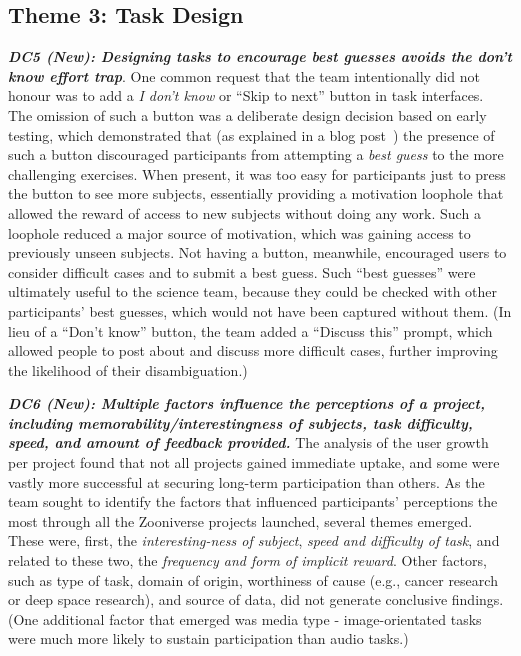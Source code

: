 \documentclass{sigchi}
\begin{document}
\begin{spacing}{0.97}
\subsection{Theme 3: Task Design} 

\textbf{\emph{DC5 (New): Designing tasks to encourage \emph{best guesses} avoids the \emph{don't know} effort trap}}. One common request that the team intentionally did not honour was to add a \emph{I don't know} or ``Skip to next'' button in task interfaces. The omission of such a button was a deliberate design decision based on early testing, which demonstrated that (as explained in a blog post~\cite{zooniverseblog}) the presence of such a button discouraged participants from attempting a \emph{best guess} to the more challenging exercises. When present, it was too easy for participants just to press the button to see more subjects, essentially providing a motivation loophole that allowed the reward of access to new subjects without doing any work. Such a loophole reduced a major source of motivation, which was gaining access to previously unseen subjects. Not having a button, meanwhile, encouraged users to consider difficult cases and to submit a best guess. Such ``best guesses'' were ultimately useful to the science team, because they could be checked with other participants' best guesses, which would not have been captured without them. (In lieu of a ``Don't know'' button, the team added a ``Discuss this'' prompt, which allowed people to post about and discuss more difficult cases, further improving the likelihood of their disambiguation.)

\textbf{\emph{DC6 (New): Multiple factors influence the perceptions of a project, including memorability/interestingness of subjects, task difficulty, speed, and amount of feedback provided.}} The analysis of the user growth per project found that not all projects gained immediate uptake, and some were vastly more successful at securing long-term participation than others. As the team sought to identify the factors that influenced participants' perceptions the most through all the Zooniverse projects launched, several themes emerged. These were, first, the \emph{interesting-ness of subject}, \emph{speed and difficulty of task}, and related to these two, the \emph{frequency and form of implicit reward}. Other factors, such as type of task, domain of origin, worthiness of cause (e.g., cancer research or deep space research), and source of data, did not generate conclusive findings. (One additional factor that emerged was media type - image-orientated tasks were much more likely to sustain participation than audio tasks.)


\end{spacing}
\end{document}
